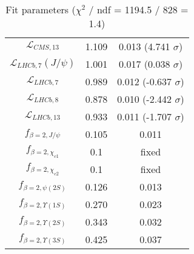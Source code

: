 \begin{table}[h!]
\begin{tabular}{c|c|c}
$\mathcal L_{CMS,13}$ & 1.109 & 0.013 (4.741 $\sigma$) \\
$\mathcal L_{LHCb,7}(J/\psi)$ & 1.001 & 0.017 (0.038 $\sigma$) \\
$\mathcal L_{LHCb,7}$ & 0.989 & 0.012 (-0.637 $\sigma$) \\
$\mathcal L_{LHCb,8}$ & 0.878 & 0.010 (-2.442 $\sigma$) \\
$\mathcal L_{LHCb,13}$ & 0.933 & 0.011 (-1.707 $\sigma$) \\
$f_{\beta=2,J/\psi}$ & 0.105 & 0.011 \\
$f_{\beta=2,\chi_{c1}}$ & 0.1 & fixed \\
$f_{\beta=2,\chi_{c2}}$ & 0.1 & fixed \\
$f_{\beta=2,\psi(2S)}$ & 0.126 & 0.013 \\
$f_{\beta=2,\Upsilon(1S)}$ & 0.270 & 0.023 \\
$f_{\beta=2,\Upsilon(2S)}$ & 0.343 & 0.032 \\
$f_{\beta=2,\Upsilon(3S)}$ & 0.425 & 0.037 \\
\end{tabular}
\caption{Fit parameters ($\chi^2$ / ndf = 1194.5 / 828 = 1.4)}
\end{table}
